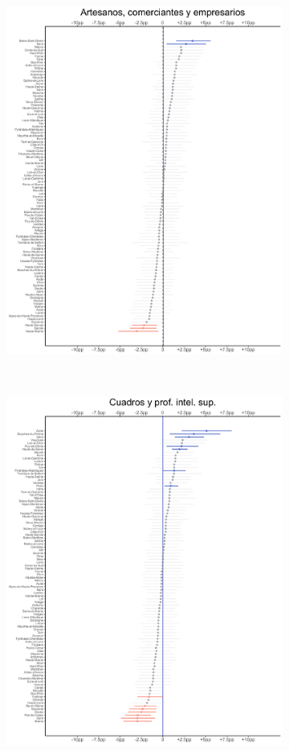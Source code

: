 \begin{figure}
\begin{subfigure}{0.45\textwidth}
	\includegraphics[width = \textwidth]{Figs/Efectos/Efectos_CSP2_Modelo_H}
	\end{subfigure}
	~
	\begin{subfigure}{0.45\textwidth}
	\includegraphics[width = \textwidth]{Figs/Efectos/Efectos_CSP3_Modelo_H}

\end{subfigure}
\end{figure}
